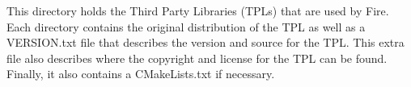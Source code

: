 This directory holds the Third Party Libraries (T\+P\+Ls) that are used by Fire. Each directory contains the original distribution of the T\+PL as well as a V\+E\+R\+S\+I\+O\+N.\+txt file that describes the version and source for the T\+PL. This extra file also describes where the copyright and license for the T\+PL can be found. Finally, it also contains a C\+Make\+Lists.\+txt if necessary. 